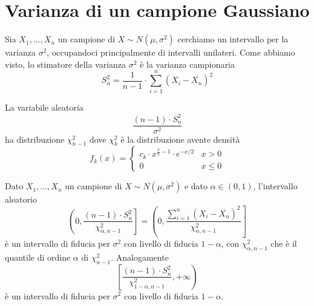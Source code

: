 \section{Varianza di un campione Gaussiano}
Sia $X_1, \dots, X_n$ un campione \iid di $X \sim N(\mu, \sigma^2)$ cerchiamo un intervallo per
la varianza $\sigma^2$, occupandoci principalmente di intervalli unilateri. Come abbiamo visto,
lo stimatore della varianza $\sigma^2$ è la varianza campionaria
\[ S_n^2 = \frac{1}{n-1} \cdot \sum_{i=1}^n (X_i - \overline{X_n})^2 \]

\begin{proposition}
	La variabile aleatoria
	\[ \frac{(n-1) \cdot S_n^2}{\sigma^2} \]
	ha distribuzione $\chi_{n-1}^2$ dove $\chi_k^2$ è la distribuzione avente densità
	\[
		f_k(x) = \begin{cases}
			c_k \cdot x^{\frac{k}{2} - 1} \cdot e^{-x/2} & x > 0    \\
			0                                            & x \leq 0
		\end{cases}
	\]
\end{proposition}

\begin{proposition}
	Dato $X_1, \dots, X_n$ un campione \iid di $X \sim N(\mu, \sigma^2)$ e dato $\alpha \in (0,1)$,
	l'intervallo aleatorio
	\[
		\left( 0, \frac{(n-1) \cdot S_n^2}{\chi_{\alpha, n-1}^2} \right] =
		\left( 0, \frac{\sum_{i=1}^n (X_i - \overline{X_n})^2}{\chi_{\alpha, n-1}^2} \right]
		\]
		è un intervallo di fiducia per $\sigma^2$ con livello di fiducia $1-\alpha$, con
		$\chi_{\alpha, n-1}^2$ che è il quantile di ordine $\alpha$ di $\chi_{n-1}^2$. Analogamente
		\[ \left[ \frac{(n-1) \cdot S_n^2}{\chi_{1-\alpha, n-1}^2}, +\infty \right) \]
	è un intervallo di fiducia per $\sigma^2$ con livello di fiducia $1-\alpha$.
\end{proposition}
